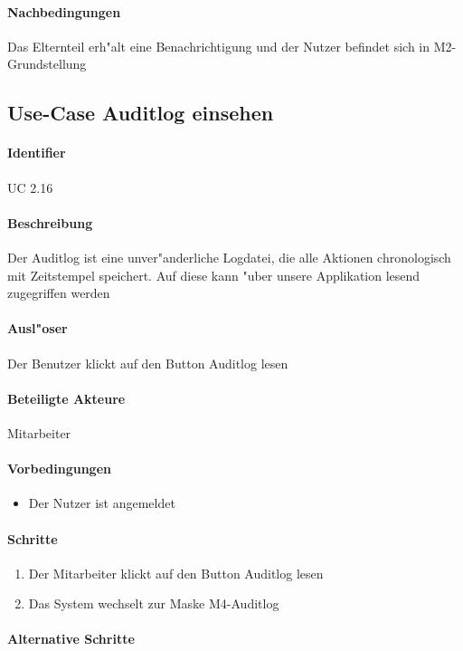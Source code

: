   \paragraph{Nachbedingungen}
  Das Elternteil erh"alt eine Benachrichtigung und der Nutzer befindet sich in M2-Grundstellung

  
  \newpage
 \subsection{Use-Case Auditlog einsehen}
  \paragraph{Identifier}
  UC 2.16
  \paragraph{Beschreibung}
  Der Auditlog ist eine unver"anderliche Logdatei, die alle Aktionen chronologisch mit Zeitstempel speichert. Auf diese kann "uber unsere Applikation lesend zugegriffen werden 
  \paragraph{Ausl"oser}
  Der Benutzer klickt auf den Button \dq Auditlog lesen\dq
  \paragraph{Beteiligte Akteure}   \leavevmode \newline
    Mitarbeiter
  \paragraph{Vorbedingungen}
  \begin{itemize}
   \item Der Nutzer ist angemeldet
  \end{itemize}

  \paragraph{Schritte}
  \begin{enumerate}
   \item Der Mitarbeiter klickt auf den Button \dq Auditlog lesen\dq
   \item Das System wechselt zur Maske M4-Auditlog
  \end{enumerate}
  \paragraph{Alternative Schritte}
